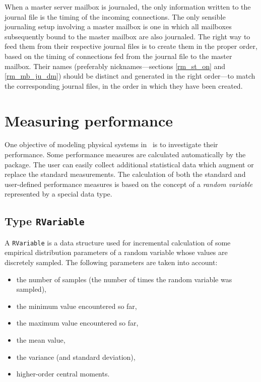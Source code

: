 When a master server
mailbox is journaled, the only information written to the
journal file is the timing of the incoming connections.
The only sensible journaling setup involving a master mailbox is one in
which all mailboxes subsequently bound to the master mailbox are also
journaled.
The right way to feed them from their respective journal files is to
create them in the proper order, based on the timing of connections
fed from the journal file to the master mailbox.
Their names (preferably nicknames---sections \ref{rm_st_on}
and \ref{rm_mb_ju_dm}) should be distinct and generated in the right order---to
match the corresponding journal files, in the order in which they have been
created.

\section{Measuring performance}
\label{rm_pm}

One objective of modeling physical systems in \smurph\ is to investigate
their performance.
Some performance measures are calculated automatically by the package.
The user can easily collect additional statistical data which augment or replace
the standard measurements.
The calculation of
both the standard and user-defined performance measures is based on the
concept of a {\em random variable\/} represented by a special data type.

\subsection{Type {\tt RVariable}}
\label{rm_pm_rv}

A {\tt RVariable} is a data structure
used for incremental calculation of some empirical distribution
parameters of a random variable whose values are discretely sampled.
The following parameters are taken into account:
\begin{itemize}
\item
the number of samples (the number of times the random variable was sampled),
\item
the minimum value encountered so far,
\item
the maximum value encountered so far,
\item
the mean value,
\item
the variance (and standard deviation),
\item
higher-order central moments.
\end{itemize}

